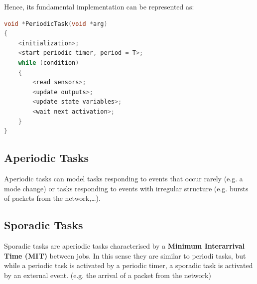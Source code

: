 Hence, its fundamental implementation can be represented as:
\begin{lstlisting}[language=C++]
void *PeriodicTask(void *arg)
{
	<initialization>;
	<start periodic timer, period = T>;
	while (condition)
	{
		<read sensors>;
		<update outputs>;
		<update state variables>;
		<wait next activation>;
	}
}
\end{lstlisting}

\subsection{Aperiodic Tasks}


Aperiodic tasks can model tasks responding to events that occur rarely (e.g. a mode change) or tasks responding to events with irregular structure (e.g. bursts of packets from the network,\dots).

\subsection{Sporadic Tasks}
Sporadic tasks are aperiodic tasks characterised by a \textbf{Minimum Interarrival Time (MIT)} between jobs.
In this sense they are similar to periodi tasks, but while a periodic task is activated by a periodic timer, a sporadic task is activated by an external event. (e.g. the arrival of a packet from the network)

